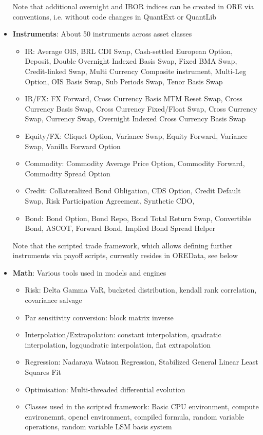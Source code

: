 \documentclass[12pt, a4paper]{report}
\begin{document}
\begin{itemize}
 {\color{red}Note that additional overnight and IBOR indices can be created in ORE via conventions, i.e. without code changes in QuantExt or QuantLib}
\item {\bf Instruments}: About 50 instruments across asset classes
  \begin{itemize}
    \item IR: Average OIS, BRL CDI Swap, Cash-settled European Option, Deposit, Double Overnight Indexed Basis Swap, Fixed BMA Swap, Credit-linked Swap, Multi Currency Composite instrument, Multi-Leg Option, OIS Basis Swap, Sub Periods Swap,  Tenor Basis Swap
    \item IR/FX: FX Forward, Cross Currency Basis MTM Reset Swap, Cross Currency Basis Swap, Cross Currency Fixed/Float Swap, Cross Currency Swap, Currency Swap, Overnight Indexed Cross Currency Basis Swap
    \item Equity/FX: Cliquet Option, Variance Swap, Equity Forward, Variance Swap, Vanilla Forward Option
  \item Commodity: Commodity Average Price Option, Commodity Forward, Commodity Spread Option
  \item Credit: Collateralized Bond Obligation, CDS Option, Credit Default Swap, Risk Participation Agreement, Synthetic CDO,
    \item Bond: Bond Option, Bond Repo, Bond Total Return Swap, Convertible Bond, ASCOT, Forward Bond, Implied Bond Spread Helper
   \end{itemize}
  {\color{red}Note that the scripted trade framework, which allows defining further instruments via payoff scripts, currently resides in OREData, see below}
\item {\bf Math}: Various tools used in models and engines
  \begin{itemize}
  \item Risk: Delta Gamma VaR, bucketed distribution, kendall rank correlation, covariance salvage
    \item Par sensitivity conversion: block matrix inverse
    \item Interpolation/Extrapolation: constant interpolation, quadratic interpolation, logquadratic interpolation, flat extrapolation
    \item Regression: Nadaraya Watson Regression, Stabilized General Linear Least Squares Fit
    \item Optimisation: Multi-threaded differential evolution
    \item Classes used in the scripted framework: Basic CPU environment, compute environemnt, opencl environment, compiled formula, random variable operations, random variable LSM basis system

\end{itemize}
\end{itemize}
\end{document}
